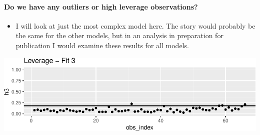 \documentclass[landscape]{article}
\newenvironment{Shaded}{\begin{snugshade}}{\end{snugshade}}
\newcommand{\KeywordTok}[1]{\textcolor[rgb]{0.13,0.29,0.53}{\textbf{#1}}}
\newcommand{\DataTypeTok}[1]{\textcolor[rgb]{0.13,0.29,0.53}{#1}}
\newcommand{\DecValTok}[1]{\textcolor[rgb]{0.00,0.00,0.81}{#1}}
\newcommand{\StringTok}[1]{\textcolor[rgb]{0.31,0.60,0.02}{#1}}
\newcommand{\OperatorTok}[1]{\textcolor[rgb]{0.81,0.36,0.00}{\textbf{#1}}}
\newcommand{\NormalTok}[1]{#1}
\providecommand{\tightlist}{%
  \setlength{\itemsep}{0pt}\setlength{\parskip}{0pt}}
\let\oldparagraph\paragraph
\renewcommand{\paragraph}[1]{\oldparagraph{#1}\mbox{}}
\begin{document}
\newpage

\paragraph{Do we have any outliers or high leverage
observations?}\label{do-we-have-any-outliers-or-high-leverage-observations}

\begin{itemize}
\tightlist
\item
  I will look at just the most complex model here. The story would
  probably be the same for the other models, but in an analysis in
  preparation for publication I would examine these results for all
  models.
\end{itemize}

\begin{Shaded}
\end{Shaded}

\includegraphics{20190422_multicollinearity_files/figure-latex/unnamed-chunk-20-1.pdf}
\end{document}
